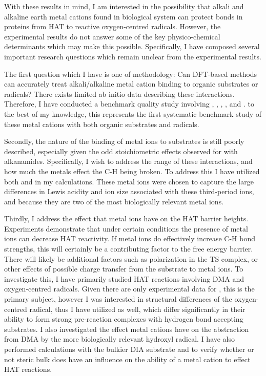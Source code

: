 With these results in mind, I am interested in the possibility that alkali and alkaline earth metal cations found in biological system can protect  bonds in proteins from HAT to reactive oxygen-centred radicals. However, the experimental results do not answer some of the key physico-chemical determinants which may make this possible. Specifically, I have composed several important research questions which remain unclear from the experimental results.

The first question which I have is one of methodology: Can DFT-based methods can accurately treat alkali/alkaline metal cation binding to organic substrates or radicals? There exists limited ab initio data describing these interactions.\cite{ Siu2001, Corral2003, Suarez2011, Baldauf2013} Therefore, I have conducted a benchmark quality study involving , , , , and . to the best of my knowledge, this represents the first systematic benchmark study of these metal cations with both organic substrates and radicals.

Secondly, the nature of the binding of metal ions to substrates is still poorly described, especially given the odd stoichiometric effects observed for  with alkanamides. Specifically, I wish to address the range of these interactions, and how much the metals effect the C-H being broken. To address this I have utilized both  and  in my calculations. These metal ions were chosen to capture the large differences in Lewis acidity and ion size associated with these third-period ions, and because they are two of the most biologically relevant metal ions.

Thirdly, I address the effect that metal ions have on the HAT barrier heights.
Experiments demonstrate that under certain conditions the presence of metal ions can decrease HAT reactivity. If metal ions do effectively increase C-H bond strengths, this will certainly be a contributing factor to the free energy barrier. There will likely be additional factors such as polarization in the TS complex, or other effects of possible charge transfer from the substrate to metal ions. To investigate this, I have primarily studied HAT reactions involving DMA and oxygen-centred radicals. Given there are only experimental data for \cumo, this is the primary subject, however I was interested in structural differences of the oxygen-centred radical, thus I have utilized \bno as well, which differ significantly in their ability to form strong pre-reaction complexes with hydrogen bond accepting substrates.\cite{Salamone2012, Salamone2013} I also investigated the effect metal cations have on the abstraction from DMA by the more biologically relevant hydroxyl radical. I have also performed calculations with the bulkier DIA substrate and \cumo to verify whether or not steric bulk does have an influence on the ability of a metal cation to effect HAT reactions.

